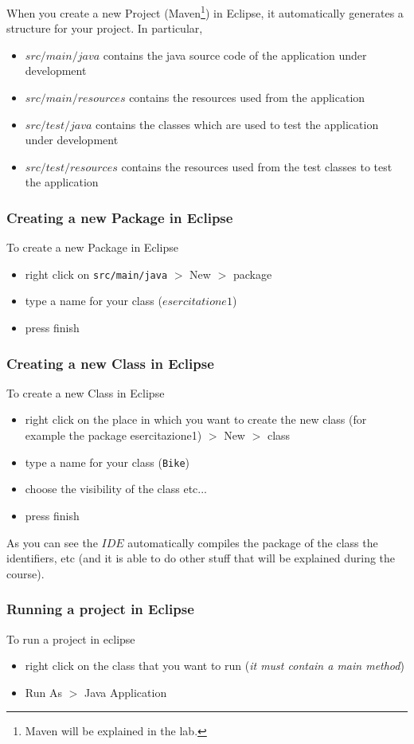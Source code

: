 \documentclass{article}
\theoremstyle{definition}
\begin{document}
When you create a new Project (Maven\footnote{Maven will be explained in the lab.}) in Eclipse, it automatically generates a structure for your project. In particular, 
\begin{itemize}
\item $src/main/java$ contains the java source code of the application under development
\item $src/main/resources$ contains the resources used from the application
\item $src/test/java$ contains the classes which are used to test the application under development
\item $src/test/resources$ contains the resources used from the test classes to test the application
\end{itemize}

\subsubsection{Creating a new Package in Eclipse}
To create a new Package in Eclipse
\begin{itemize}
\item right click on \texttt{src/main/java} $>$ New $>$ package 
\item type a name for your class ($esercitatione1$)
\item press finish
\end{itemize}

\subsubsection{Creating a new Class in Eclipse}
To create a new Class in Eclipse
\begin{itemize}
\item right click on the place in which you want to create the new class  (for example the package esercitazione1) $>$ New $>$ class 
\item type a name for your class (\texttt{Bike})
\item choose the visibility of the class etc...
\item press finish
\end{itemize}
As you can see the $IDE$ automatically compiles the package of the class the identifiers, etc (and it is able to do other stuff that will be explained during the course).


\subsubsection{Running a project in Eclipse}
\label{sec:runningAProjectInEclipse}
To run a project in eclipse
\begin{itemize}
\item right click on the class that you want to run (\emph{it must contain a main method})
\item Run As $>$ Java Application
\end{itemize}
\end{document}
